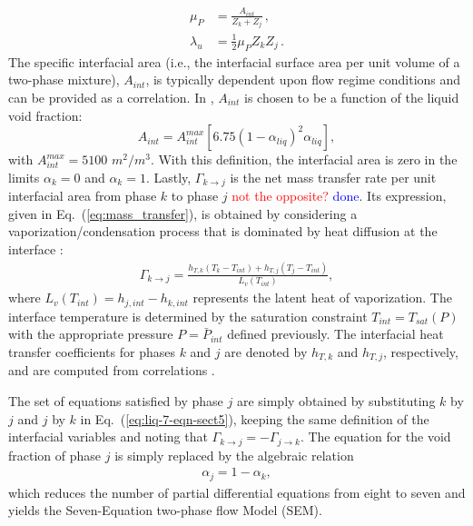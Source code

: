 \documentclass[preprint,10pt]{elsarticle}
\newcommand{\Gammakj}{\Gamma_{k \to j}}
\newcommand{\eqt}[1]{Eq.~(\ref{#1})}                     %
\newcommand{\tcr}[1]{\textcolor{red}{#1}}
\newcommand{\tcb}[1]{\textcolor{blue}{#1}}
\begin{document}
%
\begin{subequations}
\label{eq:relaxation_coeff}
\begin{align}
  \label{E-R:86}
  \mu_P &= \frac{A_{int}}{Z_{k}+Z_{j}}       \,,
  \\
  \label{E-R:85}
  \lambda_u &= \frac{1}{2} \mu_P Z_{k} Z_{j} \,.
\end{align}
\end{subequations}
%
The specific interfacial area (i.e., the interfacial surface area per unit
volume of a two-phase mixture), $A_{int}$, is typically dependent upon flow regime conditions and can be provided as a correlation. In \cite{SEM}, $A_{int}$ is chosen to be a function of the liquid void fraction:
%
\begin{equation}\label{eq:Aint-sect4}
A_{int} = A_{int}^{max} \left[ 6.75 \left(1-\alpha_{liq} \right)^2 \alpha_{liq} \right],
\end{equation}
% 
with $A_{int}^{max} = 5100$ $m^2 / m^3$. With this definition, the interfacial area is zero in the limits $\alpha_{k} = 0$ and $\alpha_{k} = 1$. Lastly, $\Gammakj$ is the net mass transfer rate per unit interfacial area from phase $k$ to phase $j$ \tcr{not the opposite?} \tcb{done}. Its expression, given in \eqt{eq:mass_transfer}, is obtained by considering a vaporization/condensation process that is dominated by heat diffusion at the interface \cite{SEM, BerryMarco_2014}:
%
\begin{align} \label{eq:mass_transfer}
  \Gammakj = \frac{h_{T,  k} \left( T_{k} - T_{int} \right) + h_{T,  j} \left( T_{j} - T_{int} \right)}{L_v \left( T_{int} \right)} ,
\end{align}
%
where $L_v \left( T_{int} \right) = h_{j,  int} - h_{k,  int}$
represents the latent heat of vaporization.  The interface
temperature is determined by the saturation constraint
$T_{int}=T_{sat}(P)$ with the appropriate pressure $P=\bar{P}_{int}$
defined previously. The interfacial heat transfer coefficients for phases $k$ and $j$ are denoted by $h_{T,  k}$ and $h_{T,  j}$, respectively, and are computed from correlations \cite{SEM}. 

The set of equations satisfied by phase $j$ are simply obtained by substituting $k$ by $j$ and $j$ by $k$ in \eqt{eq:liq-7-eqn-sect5}, keeping the same definition of the interfacial variables and noting that $\Gammakj = - \Gamma_{j\to k}$. The equation for the void fraction of phase $j$ is simply replaced by the algebraic relation
%
\begin{align}
 \alpha_{j}= 1 - \alpha_{k}, \nonumber
\end{align}
%
which reduces the number of partial differential equations from eight to seven and yields the Seven-Equation two-phase flow Model (SEM). 
\end{document}
